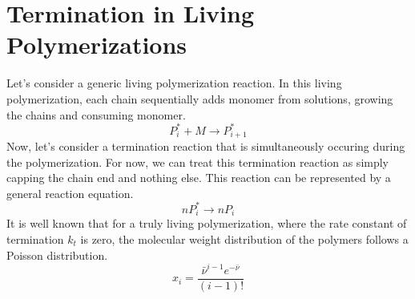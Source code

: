 \documentclass[12pt]{article}
\begin{document}
\section*{Termination in Living Polymerizations}
Let's consider a generic living polymerization reaction. In this living polymerization, each chain sequentially adds monomer from solutions, growing the chains and consuming monomer.
\begin{equation}
  P_i^*+M\rightarrow P_{i+1}^*
\end{equation}
Now, let's consider a termination reaction that is simultaneously occuring during the polymerization. For now, we can treat this termination reaction as simply capping the chain end and nothing else. This reaction can be represented by a general reaction equation.
\begin{equation}
  nP_i^*\rightarrow nP_{i}
\end{equation}
It is well known that for a truly living polymerization, where the rate constant of termination $k_t$ is zero, the molecular weight distribution of the polymers follows a Poisson distribution.
\begin{equation}
  x_i=\frac{\bar{\nu}^{i-1}e^{-\bar{\nu}}}{(i-1)!}
\end{equation}
\end{document}
